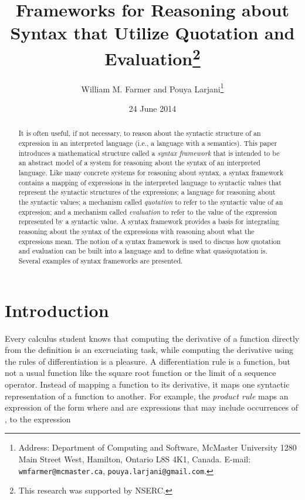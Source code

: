 \documentclass[11pt,fleqn]{article}
\title{{\bf Frameworks for Reasoning about Syntax that Utilize Quotation
  and Evaluation}\thanks{This research was supported by NSERC.}}
\author{William M. Farmer and Pouya Larjani\thanks{Address:
  Department of Computing and Software, McMaster University 1280 Main
  Street West, Hamilton, Ontario L8S 4K1, Canada. E-mail:
  \texttt{wmfarmer@mcmaster.ca}, \texttt{pouya.larjani@gmail.com}.}}
\date{24 June 2014}
\begin{document}
\maketitle

\begin{abstract}
It is often useful, if not necessary, to reason about the syntactic
structure of an expression in an interpreted language (i.e., a
language with a semantics).  This paper introduces a mathematical
structure called a \emph{syntax framework} that is intended to be an
abstract model of a system for reasoning about the syntax of an
interpreted language.  Like many concrete systems for reasoning about
syntax, a syntax framework contains a mapping of expressions in the
interpreted language to syntactic values that represent the syntactic
structures of the expressions; a language for reasoning about the
syntactic values; a mechanism called \emph{quotation} to refer to the
syntactic value of an expression; and a mechanism called
\emph{evaluation} to refer to the value of the expression represented
by a syntactic value.  A syntax framework provides a basis for
integrating reasoning about the syntax of the expressions with
reasoning about what the expressions mean.  The notion of a syntax
framework is used to discuss how quotation and evaluation can be built
into a language and to define what quasiquotation is.  Several
examples of syntax frameworks are presented.
\end{abstract}

\iffalse
\begin{keywords}
formal mathematics \sep
reasoning about syntax \sep
formal languages \sep
quotation \sep
evaluation \sep
quasiquotation
\end{keywords}
\fi

\newpage

\section{Introduction} \label{sec:intro}

Every calculus student knows that computing the derivative of a
function directly from the definition is an excruciating task, while
computing the derivative using the rules of differentiation is a
pleasure.  A differentiation rule is a function, but not a usual
function like the square root function or the limit of a sequence
operator.  Instead of mapping a function to its derivative, it maps
one syntactic representation of a function to another.  For example,
the \emph{product rule} maps an expression of the
form  where  and  are expressions
that may include occurrences of , to the
expression 
\end{document}
